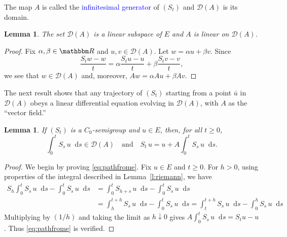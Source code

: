 \documentclass[12pt, reqno]{amsart}
\renewcommand{\geq}{\geqslant}
\newcommand{\1}{\mathbbm 1}
\newcommand*\diff{\mathop{}\!\mathrm{d}}
\newcommand{\dD}{\mathcal D}
\newcommand{\RR}{\mathbbm R}
\theoremstyle{plain}
\newtheorem{lemma}[theorem]{Lemma}
\theoremstyle{definition}
\newcommand{\navy}[1]{\textcolor{blue}{#1}}
\begin{document}
The map $A$ is called the \navy{infinitesimal generator} of $(S_t)$ and $\dD(A)$
is its domain.  

\begin{lemma}\label{l:dals}
    The set $\dD(A)$ is a linear subspace of $E$ and $A$ is linear on $\dD(A)$.
\end{lemma}

\begin{proof}
    Fix $\alpha, \beta \in \RR$ and $u,v \in \dD(A)$.  Let $w = \alpha u + \beta v$.
    Since
    \begin{equation*}
        \frac{S_t w - w}{t} 
        = \alpha \frac{S_t  u - u}{t} + \beta \frac{S_t  v - v}{t},
    \end{equation*}
    we see that $w \in \dD(A)$ and, moreover, $Aw = \alpha Au + \beta Av$.
\end{proof}

The next result shows that any trajectory of $(S_t)$ starting from a point $\bar
u$ in $\dD(A)$ obeys a linear differential equation evolving in $\dD(A)$, with $A$
as the ``vector field.''


\begin{lemma}\label{l:diffpath}
    If $(S_t)$ is a $C_0$-semigroup and $u \in E$,  then, for all $t \geq 0$,
    \begin{equation}\label{eq:pathfrome}
        \int_0^t S_s \, u \diff s \in \dD(A) \quad \text{and} \quad
        S_t \, u = u + A \int_0^t S_s \, u \diff s.
    \end{equation}
\end{lemma}


\begin{proof}
    We begin by proving \eqref{eq:pathfrome}. Fix $u \in E$ and $t \geq 0$.
    For $h > 0$, using properties of the integral described in
    Lemma~\ref{l:riemann}, we have
    \begin{align*}
            S_h \int_0^t S_s \, u \diff s - \int_0^t S_s \, u \diff s
        & = 
            \int_0^t S_{h + s} \, u \diff s - \int_0^t S_s \, u \diff s
        \\
        & = 
            \int_h^{t+h} S_s \, u \diff s - \int_0^t S_s \, u \diff s
        = 
            \int_t^{t+h} S_s \, u \diff s - \int_0^h S_s \, u \diff s
    \end{align*}
    Multiplying by $(1/h)$ and taking the limit as $h
    \downarrow 0$ gives $A \int_0^t S_s \, u \diff s = S_t u - u$. Thus
    \eqref{eq:pathfrome} is verified.
\end{proof}
\end{document}
